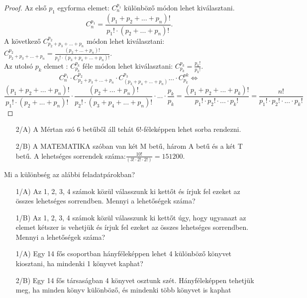 \begin{proof}
Az első $p_{1}$ egyforma elemet: $C_{n}^{p_{1}}$ különböző módon
lehet kiválasztani.
\[
C_{n}^{p_{1}}=\frac{(p_{1}+p_{2}+...+p_{n})!}{p_{1}!\cdot(p_{2}+...+p_{n})!}.
\]
A következő $C_{p_{2}+p_{3}+...+p_{n}}^{p_{2}}$ módon lehet kiválasztani:
$C_{p_{2}+p_{3}+...+p_{n}}^{p_{2}}=\frac{(p_{2}+...+p_{n})!}{p_{2}!\cdot(p_{3}+p_{4}+...+p_{n})!}.$\\
 Az utolsó $p_{k}$ elemet : $C_{p_{k}}^{p_{k}}$ féle módon lehet
kiválasztani: $C_{p_{k}}^{p_{k}}=\frac{p_{k}!}{p_{k}!}.$ 
\[
C_{n}^{p_{1}}\cdot C_{p_{2}+p_{3}+...+p_{n}}^{p_{2}}\cdot C_{(p_{3}+p_{4}+...+p_{n})}^{p_{3}}...\cdot C_{p_{k}}^{pk}\Leftrightarrow
\]
\[
\frac{(p_{1}+p_{2}+...+p_{n})!}{p_{1}!\cdot(p_{2}+...+p_{n})!}\cdot\frac{(p_{2}+...+p_{n})!}{p_{2}!\cdot(p_{3}+p_{4}+...+p_{n})!}\cdot...\cdot\frac{p_{k}}{p_{k}}=\frac{(p_{1}+p_{2}+...+p_{k})!}{p_{1}!\cdot p_{2}!\cdot...\cdot p_{k}!}=\frac{n!}{p_{1}!\cdot p_{2}!\cdot...\cdot p_{k}!}
\]
\end{proof}
\begin{solution}
	\begin{itemize}
		\item[2/A)] A Mértan szó 6 betűből áll tehát $6!$-féleképpen lehet sorba
		rendezni.
		\item[2/B)] A MATEMATIKA szóban van két M betű, három A betű és a két T
		betű. A lehetséges sorrendek száma:$\frac{10!}{(3!\cdot2!\cdot2!)}=151200.$ 
	\end{itemize}

\end{solution}
\begin{problem}
Mi a különbség az alábbi feladatpárokban?
\begin{itemize}
\item[1/A)] Az 1, 2, 3, 4 számok közül válasszunk ki kettőt és írjuk fel
ezeket az összes lehetséges sorrendben. Mennyi a lehetőségek száma?
\item[1/B)] Az 1, 2, 3, 4 számok közül válasszunk ki kettőt úgy, hogy ugyanazt
az elemet kétszer is vehetjük és írjuk fel ezeket az összes lehetséges
sorrendben. Mennyi a lehetőségek száma?
\item[1/A)] Egy 14 fős csoportban hányféleképpen lehet 4 különböző könyvet
kiosztani, ha mindenki 1 könyvet kaphat?
\item[2/B)] Egy 14 fős társaságban 4 könyvet osztunk szét. Hányféleképpen
tehetjük meg, ha minden könyv különböző, és mindenki több könyvet
is kaphat
\end{itemize}
\end{problem}
 
